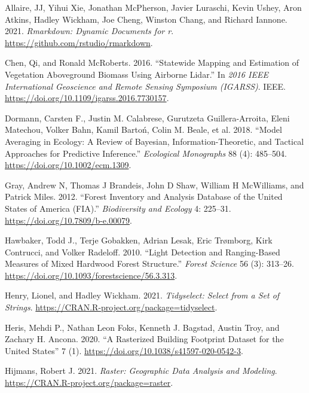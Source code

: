 \documentclass[]{elsarticle} %
\newlength{\cslhangindent}
\newenvironment{CSLReferences}[2] %
 {%
  \setlength{\parindent}{0pt}
  \ifodd #1 \everypar{\setlength{\hangindent}{\cslhangindent}}\ignorespaces\fi
  \ifnum #2 > 0
  \setlength{\parskip}{#2\baselineskip}
  \fi
 }%
 {}
\begin{document}
\hypertarget{refs}{}
\begin{CSLReferences}{1}{0}
\leavevmode{}%
Allaire, JJ, Yihui Xie, Jonathan McPherson, Javier Luraschi, Kevin Ushey, Aron Atkins, Hadley Wickham, Joe Cheng, Winston Chang, and Richard Iannone. 2021. \emph{Rmarkdown: Dynamic Documents for r}. \url{https://github.com/rstudio/rmarkdown}.

\leavevmode{}%
Chen, Qi, and Ronald McRoberts. 2016. {``Statewide Mapping and Estimation of Vegetation Aboveground Biomass Using Airborne Lidar.''} In \emph{2016 {IEEE} International Geoscience and Remote Sensing Symposium ({IGARSS})}. {IEEE}. \url{https://doi.org/10.1109/igarss.2016.7730157}.

\leavevmode{}%
Dormann, Carsten F., Justin M. Calabrese, Gurutzeta Guillera-Arroita, Eleni Matechou, Volker Bahn, Kamil Bartoń, Colin M. Beale, et al. 2018. {``Model Averaging in Ecology: A Review of Bayesian, Information-Theoretic, and Tactical Approaches for Predictive Inference.''} \emph{Ecological Monographs} 88 (4): 485--504. \url{https://doi.org/10.1002/ecm.1309}.

\leavevmode{}%
Gray, Andrew N, Thomas J Brandeis, John D Shaw, William H McWilliams, and Patrick Miles. 2012. {``Forest Inventory and Analysis Database of the United States of America (FIA).''} \emph{Biodiversity and Ecology} 4: 225--31. \url{https://doi.org/10.7809/b-e.00079}.

\leavevmode{}%
Hawbaker, Todd J., Terje Gobakken, Adrian Lesak, Eric Trømborg, Kirk Contrucci, and Volker Radeloff. 2010. {``{Light Detection and Ranging-Based Measures of Mixed Hardwood Forest Structure}.''} \emph{Forest Science} 56 (3): 313--26. \url{https://doi.org/10.1093/forestscience/56.3.313}.

\leavevmode{}%
Henry, Lionel, and Hadley Wickham. 2021. \emph{Tidyselect: Select from a Set of Strings}. \url{https://CRAN.R-project.org/package=tidyselect}.

\leavevmode{}%
Heris, Mehdi P., Nathan Leon Foks, Kenneth J. Bagstad, Austin Troy, and Zachary H. Ancona. 2020. {``A Rasterized Building Footprint Dataset for the United States''} 7 (1). \url{https://doi.org/10.1038/s41597-020-0542-3}.

\leavevmode{}%
Hijmans, Robert J. 2021. \emph{Raster: Geographic Data Analysis and Modeling}. \url{https://CRAN.R-project.org/package=raster}.


\end{CSLReferences}
\end{document}
